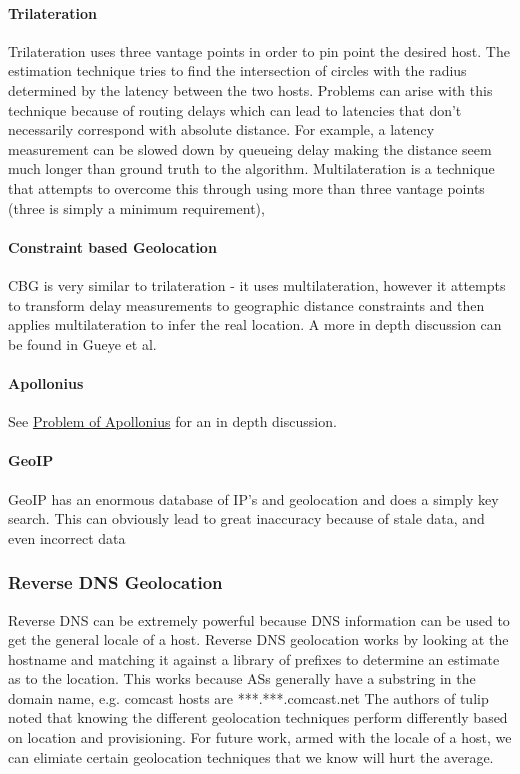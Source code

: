 \documentclass{acm_proc_article-sp}
\begin{document}
\paragraph{Trilateration}
Trilateration uses three vantage points in order to pin point the desired host. The estimation technique tries to find the intersection of 
circles with the radius determined by the latency between the two hosts. Problems can arise with this technique because of routing delays
which can lead to latencies that don't necessarily correspond with absolute distance. For example, a latency measurement can be slowed down by queueing delay
making the distance seem much longer than ground truth to the algorithm. Multilateration is a technique that attempts to overcome this through using more than three
vantage points (three is simply a minimum requirement), 
\paragraph{Constraint based Geolocation}
CBG is very similar to trilateration - it uses multilateration, however it attempts to transform delay measurements 
to geographic distance constraints and then applies multilateration to infer the real location. \cite{Gueye:2006}
A more in depth discussion can be found in Gueye et al. \cite{Gueye:2006}
\paragraph{Apollonius}
See \href{http://en.wikipedia.org/wiki/Problem\_of\_Apollonius}{Problem of Apollonius} for an in depth discussion.
\paragraph{GeoIP}
GeoIP has an enormous database of IP's and geolocation and does a simply key search. This can obviously lead
to great inaccuracy because of stale data, and even incorrect data


\subsubsection{Reverse DNS Geolocation}
Reverse DNS can be extremely powerful because DNS information can be used to get the general locale of a host. \cite{Spring:2004}
Reverse DNS geolocation works by looking at the hostname and matching it against a library of prefixes to determine an estimate as to the 
location. This works because ASs generally have a substring in the domain name, e.g. comcast hosts are ***.***.comcast.net
The authors of tulip noted that knowing the different geolocation techniques perform differently based on location
and provisioning.\cite{TulipInfoComm} 
For future work, armed with the locale of a host, we can elimiate certain geolocation techniques that we know will hurt the average.
\end{document}
